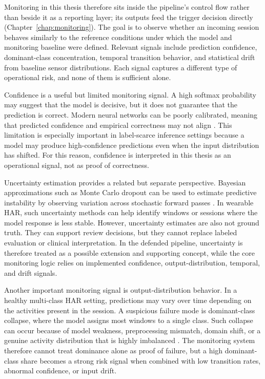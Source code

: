 Monitoring in this thesis therefore sits inside the pipeline's control flow rather than beside it as a reporting layer; its outputs feed the trigger decision directly (Chapter~\ref{chap:monitoring}). The goal is to observe whether an incoming session behaves similarly to the reference conditions under which the model and monitoring baseline were defined. Relevant signals include prediction confidence, dominant-class concentration, temporal transition behavior, and statistical drift from baseline sensor distributions. Each signal captures a different type of operational risk, and none of them is sufficient alone.

Confidence is a useful but limited monitoring signal. A high softmax probability may suggest that the model is decisive, but it does not guarantee that the prediction is correct. Modern neural networks can be poorly calibrated, meaning that predicted confidence and empirical correctness may not align \cite{guo2017calibration,blasiok2024calibration}. This limitation is especially important in label-scarce inference settings because a model may produce high-confidence predictions even when the input distribution has shifted. For this reason, confidence is interpreted in this thesis as an operational signal, not as proof of correctness.

Uncertainty estimation provides a related but separate perspective. Bayesian approximations such as Monte Carlo dropout can be used to estimate predictive instability by observing variation across stochastic forward passes \cite{gal2016dropout}. In wearable HAR, such uncertainty methods can help identify windows or sessions where the model response is less stable. However, uncertainty estimates are also not ground truth. They can support review decisions, but they cannot replace labeled evaluation or clinical interpretation. In the defended pipeline, uncertainty is therefore treated as a possible extension and supporting concept, while the core monitoring logic relies on implemented confidence, output-distribution, temporal, and drift signals.

Another important monitoring signal is output-distribution behavior. In a healthy multi-class HAR setting, predictions may vary over time depending on the activities present in the session. A suspicious failure mode is dominant-class collapse, where the model assigns most windows to a single class. Such collapse can occur because of model weakness, preprocessing mismatch, domain shift, or a genuine activity distribution that is highly imbalanced \cite{gama2014survey,hendrycks2017baseline}. The monitoring system therefore cannot treat dominance alone as proof of failure, but a high dominant-class share becomes a strong risk signal when combined with low transition rates, abnormal confidence, or input drift.

